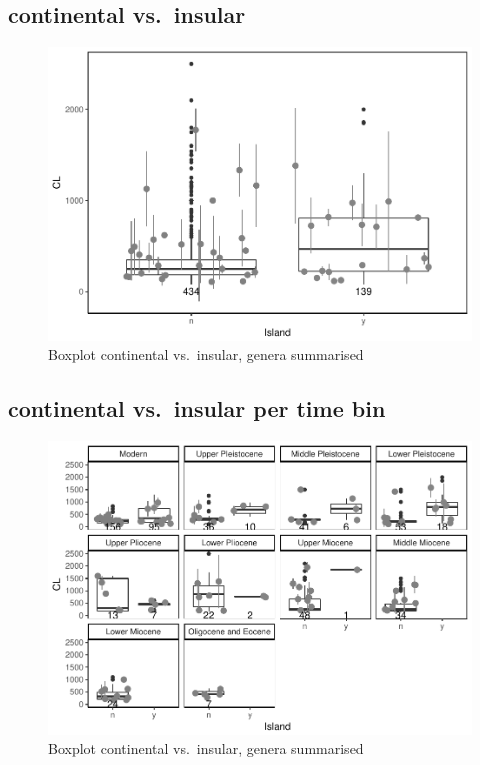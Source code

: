 \documentclass[]{article}
\begin{document}
\newpage

\subsection{continental vs.~insular}\label{continental-vs.insular-1}

\begin{figure}[htbp]
\centering
\includegraphics{MA_JJ_files/figure-latex/Boxplot continental vs. insular-1.pdf}
\caption{Boxplot continental vs.~insular, genera summarised}
\end{figure}

\newpage

\subsection{continental vs.~insular per time
bin}\label{continental-vs.insular-per-time-bin-1}

\begin{figure}[htbp]
\centering
\includegraphics{MA_JJ_files/figure-latex/Boxplot continental vs. insular, split into time bins-1.pdf}
\caption{Boxplot continental vs.~insular, genera summarised}
\end{figure}
\end{document}
